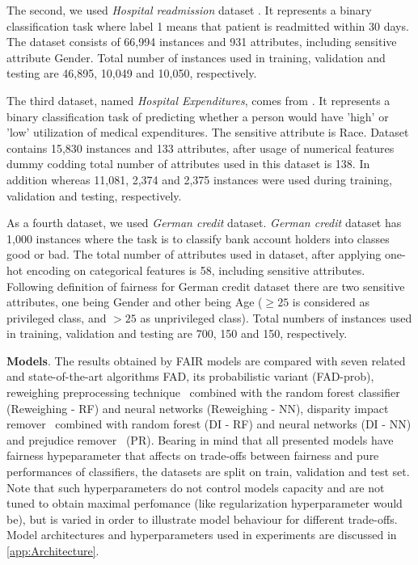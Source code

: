 \documentclass[preprint,12pt]{elsarticle}
\begin{document}
The second, we used \textit{Hospital readmission} dataset \cite{stiglic2015comprehensible}. It represents a binary classification task where label 1 means that patient is readmitted within 30 days. The dataset consists of 66,994 instances and 931 attributes, including sensitive attribute Gender. Total number of instances used in training, validation and testing are 46,895, 10,049 and 10,050, respectively.
 
The third dataset, named \textit{Hospital Expenditures}, comes from \cite{bellamy2019ai}. It represents a binary classification task of predicting whether a person would have 'high' or 'low' utilization of medical expenditures. The sensitive attribute is Race. Dataset contains 15,830 instances and 133 attributes, after usage of numerical features dummy codding total number of attributes used in this dataset is 138. In addition whereas 11,081, 2,374 and 2,375 instances were used during training, validation and testing, respectively. 

As a fourth dataset, we used \textit{German credit} dataset. \textit{German credit} dataset has 1,000 instances where the task is to classify bank account holders into classes good or bad. The total number of attributes used in dataset, after applying one-hot encoding on categorical features is 58, including sensitive attributes. Following \cite{kamiran2012decision} definition of fairness for German credit dataset there are two sensitive attributes, one being Gender and other being Age ($\geq 25$ is considered as privileged class, and $> 25$ as unprivileged class).  Total numbers of instances used in training, validation and testing are 700, 150 and 150, respectively. 

\textbf{Models}. \sloppy The results obtained by FAIR models are compared with seven related and state-of-the-art algorithms FAD, its probabilistic variant (FAD-prob), reweighing preprocessing technique~\cite{kamiran2012data} combined with the random forest classifier (Reweighing - RF) and neural networks (Reweighing - NN), disparity impact remover~\cite{feldman2015certifying} combined with random forest (DI - RF) and neural networks (DI - NN) and prejudice remover~\cite{kamishima2012fairness} (PR). Bearing in mind that all presented models have fairness hypeparameter that affects on trade-offs between fairness and pure performances of classifiers, the datasets are split on train, validation and test set. Note that such hyperparameters do not control models capacity and are not tuned to obtain maximal perfomance (like regularization hyperparameter would be), but is varied in order to illustrate model behaviour for different trade-offs. Model architectures and hyperparameters used in experiments are discussed in \ref{app:Architecture}.
\end{document}
